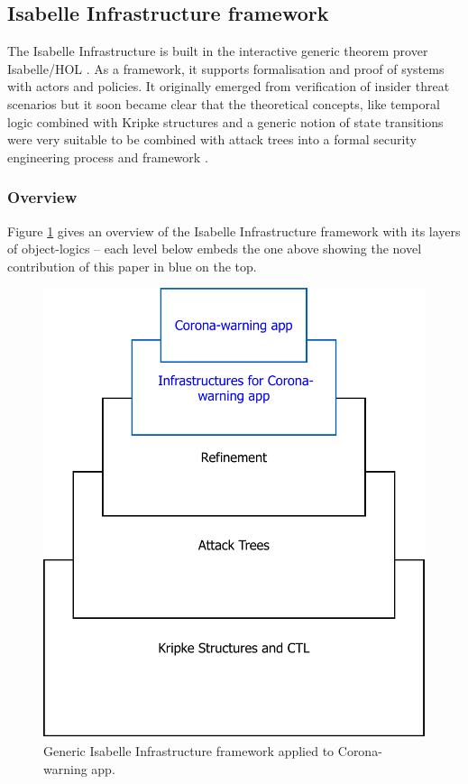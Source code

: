 \documentclass{llncs}
\newcommand{\TODO}[1]{\textcolor{red}{\textbf{[TODO:#1]}}}
\begin{document}
\subsection{Isabelle Infrastructure framework}
\label{sec:isainf}
The Isabelle Infrastructure is built in the interactive generic theorem prover
Isabelle/HOL \cite{npw:02}. As a framework, it supports formalisation and proof of
systems with actors and policies. It originally emerged from verification of insider 
threat scenarios but it soon became clear that the theoretical concepts, like temporal
logic combined with Kripke structures and a generic notion of state transitions were
very suitable to be combined with attack trees into a formal security engineering process
\cite{suc:16} and framework \cite{kam:19a}.

\subsubsection{Overview}
\label{sec:isainfover}
Figure \ref{fig:theorystruc} gives an overview of the Isabelle Infrastructure 
framework with its layers of object-logics -- each level below embeds the one
above showing the novel contribution of this paper in blue on the top. 
\begin{figure}
\begin{center}
  \includegraphics[scale=.5]{theory_structure.pdf}
\end{center}
\caption{Generic Isabelle Infrastructure framework applied to Corona-warning app.}
\label{fig:theorystruc}
\end{figure}
\end{document}

